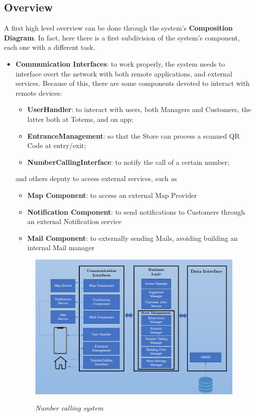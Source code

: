 \documentclass{article}
\begin{document}
	\subsection{Overview}
	A first high level overview can be done through the system's \textbf{Composition Diagram}. In fact, here there is a first subdivision of the system's component, each one with a different task.
	\begin{itemize}
		\item \textbf{Communication Interfaces}: to work properly, the system needs to interface overt the network with both remote applications, and external services. Because of this, there are some components devoted to interact with remote devices:
		\begin{itemize}
			\item{\bfseries UserHandler}: to interact with users, both Managers and Customers, the latter both at Totems, and on app;
			\item{\bfseries EntranceManagement}: so that the Store can process a scanned QR Code at entry/exit;
			\item{\bfseries NumberCallingInterface}: to notify the call of a certain number;
		\end{itemize}
		and others deputy to access external services, such as 
		\begin{itemize}
			\item{\bfseries Map Component}: to access an external Map Provider
			\item{\bfseries Notification Component}: to send notifications to Customers through an external Notification service 
			\item{\bfseries Mail Component}: to externally sending Mails, avoiding building an internal Mail manager
		\end{itemize}
	\begin{figure}[!h]
		\centering
		\includegraphics[scale=0.5]{../UML Diagrams/CompositionDiagram/CompositionDiagram.png} \\
		\caption{\emph{Number calling system}}
	\end{figure}
	

\end{itemize}
\end{document}
